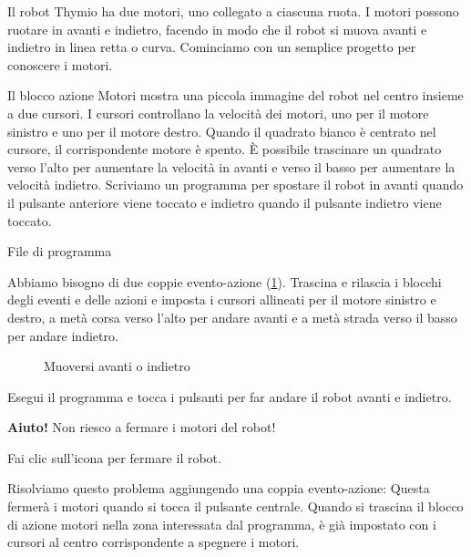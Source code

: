 
\label{ch.moving}


Il robot Thymio ha due motori, uno collegato a ciascuna ruota. I
motori possono ruotare in avanti e indietro, facendo in modo che il robot si muova
avanti e indietro in linea retta o curva. Cominciamo con un semplice
progetto per conoscere i motori.

Il blocco azione Motori  mostra una piccola immagine del
robot nel centro insieme a due cursori. I cursori controllano la
velocità dei motori, uno per il motore sinistro e uno per il motore destro. Quando il quadrato bianco è centrato nel cursore, il
corrispondente motore è spento. È possibile trascinare un quadrato verso l'alto per aumentare la
velocità in avanti e verso il basso per aumentare la velocità indietro.
Scriviamo un programma per spostare il robot in avanti quando il pulsante anteriore
viene toccato e indietro quando il pulsante indietro viene toccato.

{\raggedleft \hfill File di programma }

Abbiamo bisogno di due coppie evento-azione (\cref{fig.nostop}). Trascina e rilascia
i blocchi degli eventi e delle azioni e imposta i cursori allineati per il motore sinistro e destro, a metà corsa verso l'alto per andare avanti e a metà strada verso il basso per andare indietro.

\begin{figure}
\begin{center}
\caption{Muoversi avanti o indietro}\label{fig.nostop}
\end{center}
\end{figure}


Esegui il programma e tocca i pulsanti per
far andare il robot avanti e indietro.

\newpage


\textbf{Aiuto!} Non riesco a fermare i motori del robot!

Fai clic sull'icona  per fermare il robot.

Risolviamo questo problema aggiungendo una coppia evento-azione: 
Questa fermerà i motori quando si tocca il pulsante centrale. Quando si
trascina il blocco di azione motori nella zona interessata dal programma, è già impostato
con i cursori al centro corrispondente a spegnere i motori.

